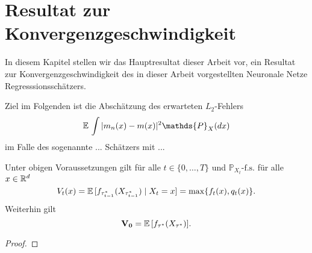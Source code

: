 \chapter{Resultat zur Konvergenzgeschwindigkeit}
\label{chap:3}

In diesem Kapitel stellen wir das Hauptresultat dieser Arbeit vor, ein Resultat zur Konvergenzgeschwindigkeit des in dieser Arbeit vorgestellten Neuronale Netze Regresssionsschätzers.

Ziel im Folgenden ist die Abschätzung des erwarteten $L_2$-Fehlers 
$$\E \int |m_n(x) - m(x)|^2  \mathds{P}_X(dx)$$
im Falle des sogenannte ... Schätzers mit ... 

\begin{thm}\label{optstop}
    Unter obigen Voraussetzungen gilt für alle $t \in \{0,\dots,T\}$ und $\mathds{P}_{X_t}\text{-f.s.}$ für alle $x \in \mathbb{R}^d$
    \begin{equation}\label{eq:1}
        V_t (x) = \mathbb{E}\, [f_{\tau_{t-1}^*}(X_{\tau_{t-1}^*}) \mid X_t = x] = \max\{f_t(x),q_t(x)\}.
    \end{equation}
    Weiterhin gilt
    \begin{equation}\label{eq:2}
        \mathbf{V_0} = \mathbb{E}\, [f_{\tau^*}(X_{\tau^*})].
    \end{equation}
\end{thm}
\begin{proof}

\end{proof}